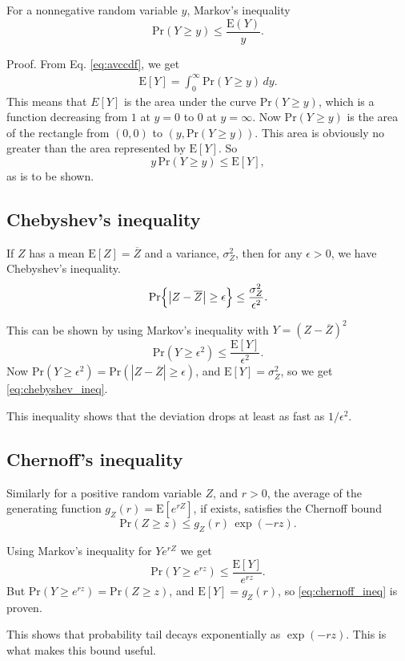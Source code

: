 \documentclass{article}
\begin{document}
For a nonnegative random variable $y$, Markov's inequality 
\begin{equation}
\mathrm{Pr}(Y\ge y) \le \frac{ \mathrm{E}(Y) } { y }.
\label{eq:markov_eq}
\end{equation}

Proof.
From Eq. \eqref{eq:avccdf}, we get
$$
\begin{aligned}
\mathrm{E}[Y] = \int_0^\infty \mathrm{Pr}(Y \ge y) \, dy.
\end{aligned}
$$
This means that $E[Y]$ is the area under the curve $\mathrm{Pr}(Y\ge y)$,
which is a function decreasing from $1$ at $y = 0$ to $0$ at $y = \infty$.
%
Now $\mathrm{Pr}(Y\ge y)$ is the area of the rectangle from $(0, 0)$
to $(y, \mathrm{Pr}(Y\ge y))$.
This area is obviously no greater than the area represented by $\mathrm{E}[Y]$.
So
%
$$
y \, \mathrm{Pr}(Y \ge y) \le \mathrm{E}[Y],
$$
as is to be shown.


\subsection{Chebyshev's inequality}

If $Z$ has a mean $\mathrm{E}[Z] = \overline Z$
and a variance, $\sigma_Z^2$, then for any $\epsilon > 0$,
we have Chebyshev's inequality.
\begin{equation}
\mathrm{Pr}\Bigl\{\bigl|Z - \overline Z \bigr|\ge \epsilon\Bigr\} \le \frac{\sigma_Z^2}{\epsilon^2}.
\label{eq:chebshev_ineq}
\end{equation}

This can be shown by using Markov's inequality with $Y = (Z - \overline Z)^2$
$$
\mathrm{Pr}(Y \ge \epsilon^2)
\le
\frac{ \mathrm{E}[Y] } { \epsilon^2 }.
$$
Now 
$\mathrm{Pr}(Y \ge \epsilon^2) = \mathrm{Pr}(|Z - \overline Z| \ge \epsilon)$,
and
$\mathrm{E}[Y] = \sigma_Z^2$,
so we get \eqref{eq:chebyshev_ineq}.

This inequality shows that the deviation drops at least as fast as $1/\epsilon^2$.


\subsection{Chernoff's inequality}

Similarly for a positive random variable $Z$, and $r > 0$, the average of
the generating function $g_Z(r) = \mathrm{E}[e^{rZ}]$, if exists, satisfies
the Chernoff bound
\begin{equation}
\mathrm{Pr}(Z \ge z)
\le g_Z(r) \, \exp(-rz).
\label{eq:chernoff_ineq}
\end{equation}

Using Markov's inequality for $Y e^{rZ}$ we get
$$
\mathrm{Pr}(Y \ge e^{rz})
\le
\frac{ \mathrm{E}[Y] } { e^{rz} }.
$$
But $\mathrm{Pr}(Y \ge e^{rz}) = \mathrm{Pr}(Z \ge z)$,
and $\mathrm{E}[Y] = g_Z(r)$, so \eqref{eq:chernoff_ineq} is proven.

This shows that probability tail decays exponentially as $\exp(-rz)$.
This is what makes this bound useful.
\end{document}
